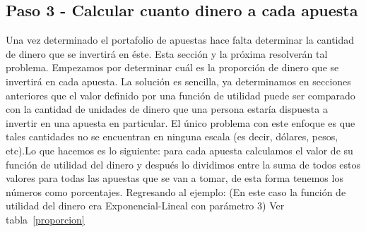 \begin{table}[ht]
\centering
{}
\caption{Escogiendo apuestas que vale la pena realizar}
\label{seleccion}
\end{table}

\subsection{Paso 3 - Calcular cuanto dinero a cada apuesta}
\label{sec:paso-3}

Una vez determinado el portafolio de apuestas hace falta determinar la cantidad de dinero que se invertirá en éste. Esta sección y la próxima resolverán tal problema.
 Empezamos por determinar cuál es la proporción de dinero que se invertirá en cada apuesta. La solución es sencilla, ya determinamos en secciones anteriores que el valor definido por una función de utilidad puede ser comparado con la cantidad de unidades de dinero que una persona estaría dispuesta a invertir en una apuesta en particular. El único problema con este enfoque es que tales cantidades no se encuentran en ninguna escala (es decir, dólares, pesos, etc).Lo que hacemos es lo siguiente: para cada apuesta calculamos el valor de su función de utilidad del dinero y después lo dividimos entre la suma de todos estos valores para todas las apuestas que se van a tomar, de esta forma tenemos los números como porcentajes.
 Regresando al ejemplo: (En este caso la función de utilidad del dinero era Exponencial-Lineal con parámetro 3)
Ver tabla~\ref{proporcion}

